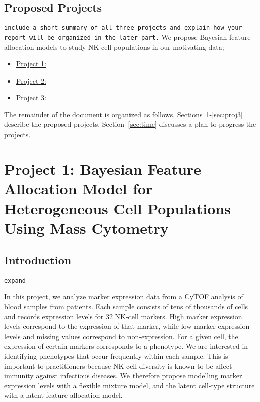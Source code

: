 \documentclass[12pt,]{article}
\begin{document}
\subsection{Proposed Projects}
{\tt include a short summary of all three projects and explain how your report
will be organized in the later part.}
We propose Bayesian feature allocation models to study NK cell populations in
our motivating data;
\begin{itemize}
\item \underline{Project 1:}

\item \underline{Project 2:}

\item \underline{Project 3:}

\end{itemize} 
The remainder of the document is organized as follows.
Sections~\ref{sec:proj1}-\ref{sec:proj3} describe the proposed projects.
Section~\ref{sec:time} discusses a plan to progress the projects.  





\section{Project 1: Bayesian Feature Allocation Model for Heterogeneous Cell Populations Using Mass Cytometry}\label{sec:proj1}
\subsection{Introduction}

{\tt expand} 

In this project, we analyze marker expression data from a CyTOF analysis of
blood samples from patients. Each sample consists of tens of thousands of cells
and records expression levels for 32 NK-cell markers. High marker expression
levels correspond to the expression of that marker, while low marker expression
levels and missing values correspond to non-expression. For a given cell, the
expression of certain markers corresponds to a phenotype. We are interested in
identifying phenotypes that occur frequently within each sample. This is
important to practitioners because NK-cell diversity is known to be affect
immunity against infectious diseases. We therefore propose modelling marker
expression levels with a flexible mixture model, and the latent cell-type
structure with a latent feature allocation model.
\end{document}
